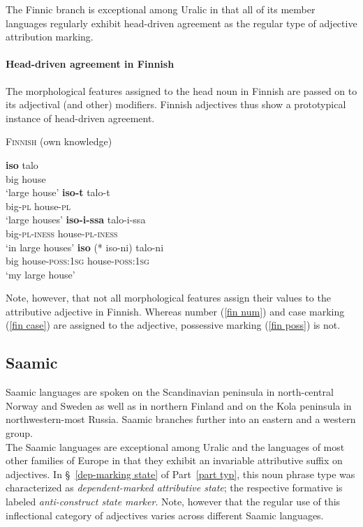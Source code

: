 The Finnic branch is exceptional among Uralic in that all of its member languages regularly exhibit head-driven agreement as the regular type of adjective attribution marking.

\paragraph{Head-driven agreement in Finnish} \label{finnish synchr}
The morphological features assigned to the head noun in Finnish are passed on to its adjectival (and other) modifiers. Finnish adjectives thus show a prototypical instance of head-driven agreement. 
\begin{exe}
\ex \textsc{Finnish} (own knowledge)
\begin{xlist}
\ex
\gll	\textbf{iso} talo\\
	big house\\
\glt	‘large house’
\ex	\label{fin num}
\gll	\textbf{iso-t} talo-t\\
	big-\textsc{pl} house-\textsc{pl}\\
\glt	‘large houses’
\ex	\label{fin case}
\gll	\textbf{iso-i-ssa}	talo-i-ssa\\
	big-\textsc{pl}-\textsc{iness} house-\textsc{pl}-\textsc{iness}\\
\glt	‘in large houses’
\ex 	\label{fin poss}
\gll	\textbf{iso} (* iso-ni) talo-ni\\
	big {} house-\textsc{poss:1sg} house-\textsc{poss:1sg}\\
\glt	‘my large house’
\end{xlist}
\end{exe}
Note, however, that not all morphological features assign their values to the attributive adjective in Finnish. Whereas number (\ref{fin num}) and case marking (\ref{fin case}) are assigned to the adjective, possessive marking (\ref{fin poss}) is not.

\subsection{Saamic}\label{saami synchr}
Saamic languages are spoken on the Scandinavian peninsula in north-central Norway and Sweden as well as in northern Finland and on the Kola peninsula in northwestern-most Russia. Saamic branches further into an eastern and a western group.\\

The Saamic languages are exceptional among Uralic and the languages of most other families of Europe in that they exhibit an invariable attributive suffix on adjectives. In \S~\ref{dep-marking state} of Part~\ref{part typ}, this noun phrase type was characterized as \textit{dependent-marked attributive state}; the respective formative is labeled \textit{anti-construct state marker}. Note, however that the regular use of this inflectional category of adjectives varies across different Saamic languages.

